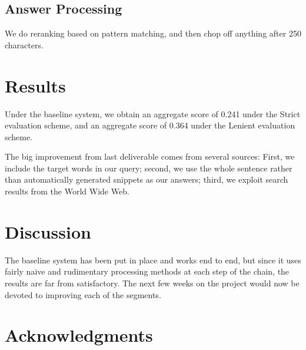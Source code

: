 \documentclass[11pt]{article}
\begin{document}
\subsection{Answer Processing}
We do reranking based on pattern matching, and then chop off anything after 250 characters.

\section{Results}

Under the baseline system, we obtain an aggregate score of 0.241 under the Strict evaluation scheme, and an aggregate score of 0.364 under the Lenient evaluation scheme.

The big improvement from last deliverable comes from several sources: First, we include the target words in our query; second, we use the whole sentence rather than automatically generated snippets as our answers; third, we exploit search results from the World Wide Web.

\section{Discussion}
\label{sec:discussion}

The baseline system has been put in place and works end to end, but since it uses fairly naive and rudimentary processing methods at each step of the chain, the results are far from satisfactory. The next few weeks on the project would now be devoted to improving each of the segments. 
\section*{Acknowledgments}


\printbibliography 
\end{document}
